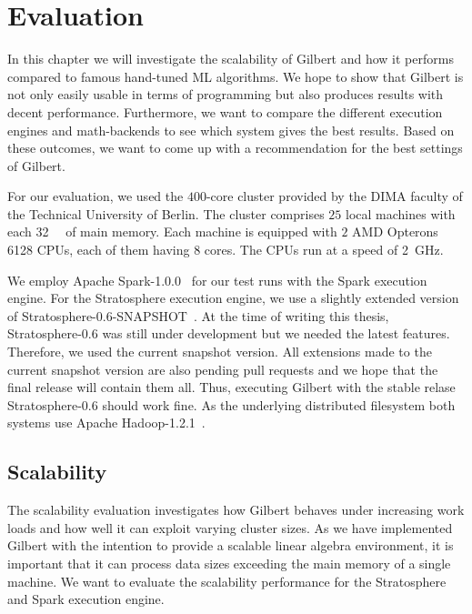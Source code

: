 \chapter{Evaluation}
\label{cha:evaluation}


In this chapter we will investigate the scalability of Gilbert and how it performs compared to famous hand-tuned ML algorithms.
We hope to show that Gilbert is not only easily usable in terms of programming but also produces results with decent performance.
Furthermore, we want to compare the different execution engines and math-backends to see which system gives the best results.
Based on these outcomes, we want to come up with a recommendation for the best settings of Gilbert.

For our evaluation, we used the $400$-core cluster provided by the DIMA faculty of the Technical University of Berlin.
The cluster comprises $25$ local machines with each \SI{32}{\giga\byte} of main memory.
Each machine is equipped with $2$ AMD Opterons 6128 CPUs, each of them having $8$ cores.
The CPUs run at a speed of \SI{2}{\giga\hertz}.

We employ Apache Spark-1.0.0~\cite{spark} for our test runs with the Spark execution engine.
For the Stratosphere execution engine, we use a slightly extended version of Stratosphere-0.6-SNAPSHOT~\cite{stratosphere}.
At the time of writing this thesis, Stratosphere-0.6 was still under development but we needed the latest features.
Therefore, we used the current snapshot version.
All extensions made to the current snapshot version are also pending pull requests and we hope that the final release will contain them all.
Thus, executing Gilbert with the stable relase Stratosphere-0.6 should work fine.
As the underlying distributed filesystem both systems use Apache Hadoop-1.2.1~\cite{hadoop:2008a}.

\section{Scalability}

The scalability evaluation investigates how Gilbert behaves under increasing work loads and how well it can exploit varying cluster sizes.
As we have implemented Gilbert with the intention to provide a scalable linear algebra environment, it is important that it can process data sizes exceeding the main memory of a single machine.
We want to evaluate the scalability performance for the Stratosphere and Spark execution engine.

